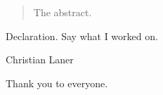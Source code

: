 
\begin{abstract}%
  The abstract.
\end{abstract}


\begin{declaration}
  Declaration. Say what I worked on.
  \vspace*{1cm}
  \begin{flushright}
    Christian Laner
  \end{flushright}
\end{declaration}


\begin{acknowledgements}
  Thank you to everyone.
\end{acknowledgements}


%

\tableofcontents



\thispagestyle{empty}
